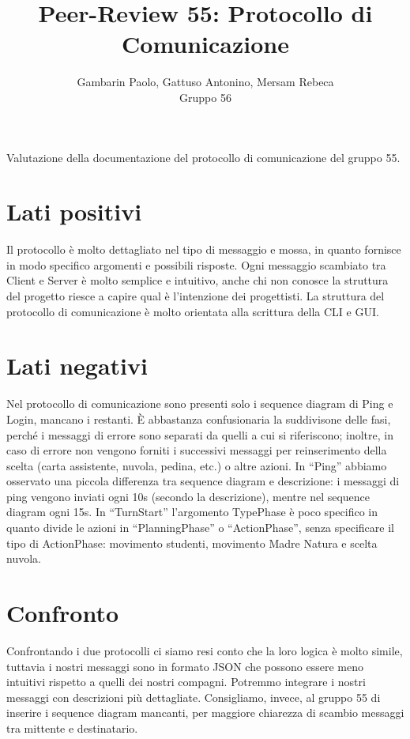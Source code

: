 \documentclass[12pt]{article}
\title{Peer-Review 55: Protocollo di Comunicazione}
\author{Gambarin Paolo, Gattuso Antonino, Mersam Rebeca\\Gruppo 56}
\begin{document}
\maketitle

Valutazione della documentazione del protocollo di comunicazione del gruppo 55.

\section{Lati positivi}

Il protocollo è molto dettagliato nel tipo di messaggio e mossa, in quanto fornisce in modo specifico
argomenti e possibili risposte. Ogni messaggio scambiato tra Client e Server è molto semplice e
intuitivo, anche chi non conosce la struttura del progetto riesce a capire qual è l’intenzione dei
progettisti.
La struttura del protocollo di comunicazione è molto orientata alla scrittura della CLI e GUI.

\section{Lati negativi}

Nel protocollo di comunicazione sono presenti solo i sequence diagram di Ping e Login, mancano i
restanti.
È abbastanza confusionaria la suddivisone delle fasi, perché i messaggi di errore sono separati da
quelli a cui si riferiscono; inoltre, in caso di errore non vengono forniti i successivi messaggi per
reinserimento della scelta (carta assistente, nuvola, pedina, etc.) o altre azioni.
In “Ping” abbiamo osservato una piccola differenza tra sequence diagram e descrizione: i messaggi
di ping vengono inviati ogni 10s (secondo la descrizione), mentre nel sequence diagram ogni 15s.
In “TurnStart” l’argomento TypePhase è poco specifico in quanto divide le azioni in “PlanningPhase”
o “ActionPhase”, senza specificare il tipo di ActionPhase: movimento studenti, movimento Madre
Natura e scelta nuvola.

\section{Confronto}

Confrontando i due protocolli ci siamo resi conto che la loro logica è molto simile, tuttavia i nostri
messaggi sono in formato JSON che possono essere meno intuitivi rispetto a quelli dei nostri
compagni. Potremmo integrare i nostri messaggi con descrizioni più dettagliate.
Consigliamo, invece, al gruppo 55 di inserire i sequence diagram mancanti, per maggiore chiarezza
di scambio messaggi tra mittente e destinatario.
\end{document}
